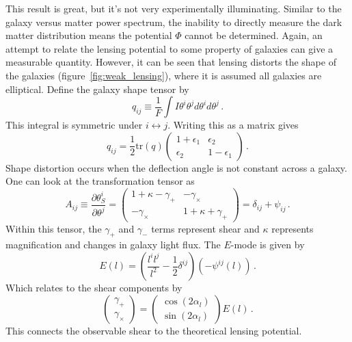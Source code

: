 This result is great, but it's not very experimentally illuminating. Similar to the galaxy versus matter power spectrum, the inability to directly measure the dark matter distribution means the potential $\Phi$ cannot be determined. Again, an attempt to relate the lensing potential to some property of galaxies can give a measurable quantity. However, it can be seen that lensing distorts the shape of the galaxies (figure~\ref{fig:weak_lensing}), where it is assumed all galaxies are elliptical. Define the galaxy shape tensor by
\begin{equation}
	q_{ij} \equiv \frac{1}{F}\int I\theta^i\theta^j d\theta^i d\theta^j\,.
\end{equation}
This integral is symmetric under $i \leftrightarrow j$. Writing this as a matrix gives
\begin{equation}
	q_{ij} = \frac{1}{2} \text{tr}(q) \left( 
	\begin{array}{cc}
	1+\epsilon_1 & \epsilon_2 \\
	\epsilon_2 & 1-\epsilon_1
	\end{array}
	\right)\,.
\end{equation}
Shape distortion occurs when the deflection angle is not constant across a galaxy. One can look at the transformation tensor as
\begin{equation}
	A_{ij} \equiv \frac{\partial \theta^i_S}{\partial\theta^j} = \left( 
	\begin{array}{cc}
	1+\kappa - \gamma_+ & -\gamma_\times \\
	-\gamma_\times & 1+\kappa+\gamma_+
	\end{array}
	\right) = \delta_{ij}+\psi_{ij}\,.
\end{equation}
Within this tensor, the $\gamma_+$ and $\gamma_-$ terms represent shear and $\kappa$ represents magnification and changes in galaxy light flux. The $E$-mode is given by
\begin{equation}
	E(l) = \left( \frac{l^il^j}{l^2} - \frac{1}{2}\delta^{ij} \right)(-\psi^{ij}(l))\,.
\end{equation}
Which relates to the shear components by
\begin{equation}
	\left(
	\begin{array}{c}
	\gamma_+ \\
	\gamma_\times
	\end{array}
	\right)
	=
	\left(
	\begin{array}{c}
	\cos(2\alpha_l) \\
	\sin(2\alpha_l)
	\end{array}
	\right)
	E(l)\,.
\end{equation}
This connects the observable shear to the theoretical lensing potential.
